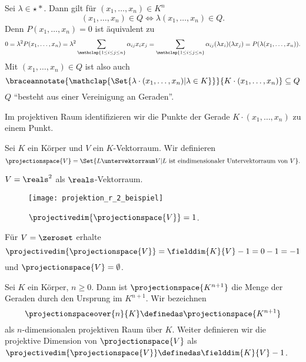 Sei \( \lambda\in \star{*} \). Dann gilt für \( (x_1,\dotsc,x_n)\in K^n \)
\begin{equation*}
  (x_1,\dotsc,x_n)\in Q\iff \lambda(x_1,\dotsc,x_n)\in Q.
\end{equation*}
Denn \( P(x_1,\dotsc,x_n)=0 \) ist äquivalent zu 
\begin{equation*}
  0=\lambda^2 P(x_1,\dotsc,x_n)=\lambda^2 \sum_{\mathclap{1\leq i\leq j\leq n}} \alpha_{ij}x_i x_j=\sum_{\mathclap{1\leq i\leq j\leq n}} \alpha_{ij}(\lambda x_i)(\lambda x_j)=P(\lambda(x_1,\dotsc,x_n)).
\end{equation*}
Mit \( (x_1,\dotsc,x_n)\in Q \) ist also auch
\begin{equation*}
  \braceannotate{\mathclap{\Set{\lambda\cdot (x_1,\dotsc,x_n)|\lambda\in K}}}{K\cdot (x_1,\dotsc, x_n)}\subseteq Q
\end{equation*}
\dh \( Q \) \enquote{besteht aus einer Vereinigung an Geraden}.
\begin{idee*}
  Im projektiven Raum identifizieren wir die Punkte der Gerade \( K\cdot(x_1,\dotsc,x_n) \) zu einem Punkt.
\end{idee*}  
\begin{definition*}
  Sei \( K \) ein Körper und \( V \) ein \( K \)-Vektorraum. Wir definieren
  \begin{equation*}
    \projectionspace{V}=\Set{L\untervektorraum V| L\ \text{ist eindimensionaler Untervektorraum von \( V \)}}.
  \end{equation*}
\end{definition*}
\begin{beispiel*}
  \( V=\reals^2 \) als \( \reals \)-Vektorraum.
  \begin{figure}[H]
    \centering
    \texttt{[image: projektion\_r\_2\_beispiel]}
    \caption*{\( \projectivedim{\projectionspace{V}}=1 \).}
    \label{fig:projektion_r_2_beispiel}
  \end{figure}
\end{beispiel*}
\begin{bemerkung*}
  Für \( V=\zeroset \) erhalte
  \begin{equation*}
    \projectivedim{\projectionspace{V}}=\fielddim{K}{V}-1=0-1=-1
  \end{equation*}
  und \( \projectionspace{V}=\emptyset \).
\end{bemerkung*}
\begin{bspdef}
  Sei \( K \) ein Körper, \( n\geq 0 \). Dann ist \( \projectionspace{K^{n+1}} \) die Menge der Geraden durch den Ursprung im \( K^{n+1} \). Wir bezeichnen
  \begin{equation*}
    \projectionspaceover{n}{K}\definedas \projectionspace{K^{n+1}}
  \end{equation*}
  als \( n \)-dimensionalen projektiven Raum über \( K \). Weiter definieren wir die projektive Dimension von \( \projectionspace{V} \) als \( \projectivedim{\projectionspace{V}}\definedas \fielddim{K}{V}-1 \).
\end{bspdef}
